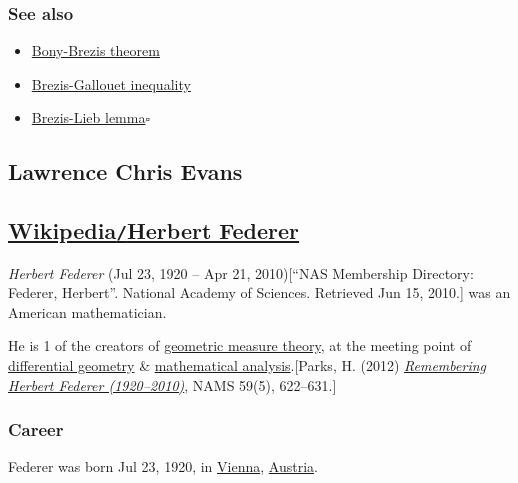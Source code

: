 \documentclass{article}
\begin{document}
\subsubsection{See also}
\begin{itemize}
	\item \href{https://en.wikipedia.org/wiki/Bony%E2%80%93Brezis_theorem}{Bony-Brezis theorem}
	\item \href{https://en.wikipedia.org/wiki/Brezis%E2%80%93Gallouet_inequality}{Brezis-Gallouet inequality}
	\item \href{https://en.wikipedia.org/wiki/Brezis%E2%80%93Lieb_lemma}{Brezis-Lieb lemma}\hfill$\square$
\end{itemize}



\subsection{Lawrence Chris Evans}


\subsection{\href{https://en.wikipedia.org/wiki/Herbert_Federer}{Wikipedia{\tt/}Herbert Federer}}
\textit{Herbert Federer} (Jul 23, 1920 -- Apr 21, 2010)[``NAS Membership Directory: Federer, Herbert''. National Academy of Sciences. Retrieved Jun 15, 2010.] was an American mathematician.

He is 1 of the creators of \href{https://en.wikipedia.org/wiki/Geometric_measure_theory}{geometric measure theory}, at the meeting point of \href{https://en.wikipedia.org/wiki/Differential_geometry}{differential geometry} \& \href{https://en.wikipedia.org/wiki/Mathematical_analysis}{mathematical analysis}.[Parks, H. (2012) \href{http://www.ams.org/notices/201205/rtx120500622p.pdf}{\textit{Remembering Herbert Federer (1920--2010)}}, NAMS 59(5), 622--631.]

\subsubsection{Career}
Federer was born Jul 23, 1920, in \href{https://en.wikipedia.org/wiki/Vienna}{Vienna}, \href{https://en.wikipedia.org/wiki/Austria}{Austria}.
\end{document}
